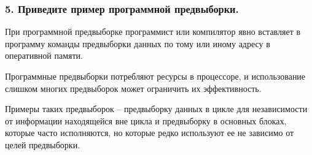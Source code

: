 \subsubsection{5. Приведите пример программной предвыборки.}

При программной предвыборке программист или компилятор явно вставляет в программу команды предвыборки данных по тому или иному адресу в оперативной памяти. 

Программные предвыборки потребляют ресурсы в процессоре, и использование слишком многих предвыборок может ограничить их эффективность. 

Примеры таких предвыборок -- предвыборку данных в цикле для независимости от информации находящейся вне цикла и предвыборку в основных блоках, которые часто исполняются, но которые редко используют ее не зависимо от целей предвыборки.
